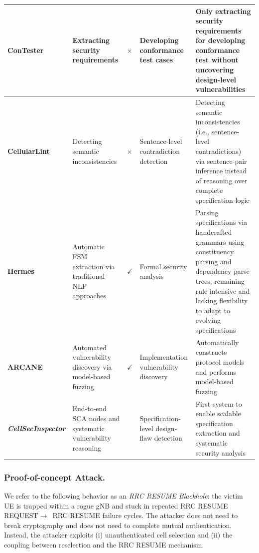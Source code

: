 \documentclass[sigconf]{acmart}
\newcommand{\cmark}{$\checkmark$}
\newcommand{\cmarkbold}{\boldmath\checkmark}
\newcommand{\xmark}{$\times$}
\newcommand{\lm}{\textit{CellSecInspector}\xspace}
\begin{document}
{\begin{table}[!t]
\begin{tabular}{p{1.8cm} p{3cm} >{\centering}p{1.8cm} p{2.8cm} p{6cm}}
\midrule

\textbf{ConTester}~\cite{chen2023sherlock} &
Extracting security requirements &
\xmark &
Developing conformance test cases &
Only extracting security requirements for developing conformance test without uncovering design-level vulnerabilities \\


\midrule

\textbf{CellularLint}~\cite{rahman2024cellularlint} &
Detecting semantic inconsistencies &
\xmark &
Sentence‐level contradiction detection &
Detecting semantic inconsistencies (i.e., sentence-level contradictions) via sentence-pair inference instead of reasoning over complete specification logic \\

\midrule

\textbf{Hermes}~\cite{al2024hermes} &
Automatic FSM extraction via traditional NLP approaches &
\cmark &
Formal security analysis &
Parsing specifications via handcrafted grammars using constituency parsing and dependency parse trees, remaining rule-intensive and lacking flexibility to adapt to evolving specifications \\

\midrule

\textbf{ARCANE}~\cite{tan2025automated} &
Automated vulnerability discovery via model-based fuzzing &
\cmark &
Implementation vulnerability discovery &
Automatically constructs protocol models and performs model-based fuzzing \\

\midrule

\textbf{\lm } &
End‐to‐end SCA nodes and systematic vulnerability reasoning &
\cmarkbold &
Specification‐level design‐flaw detection &
First system to enable scalable specification extraction and systematic security analysis \\

\bottomrule
\end{tabular}
\end{table}



\subsubsection{Proof-of-concept Attack.} 
We refer to the following behavior as an \emph{RRC RESUME Blackhole}: the victim UE is trapped within a rogue gNB and stuck in repeated RRC RESUME REQUEST$\rightarrow$\ RRC RESUME failure cycles. 
The attacker does not need to break cryptography and does not need to complete mutual authentication. Instead, the attacker exploits (i) unauthenticated cell selection and (ii) the coupling between reselection and the RRC RESUME mechanism. 

}
\end{document}

